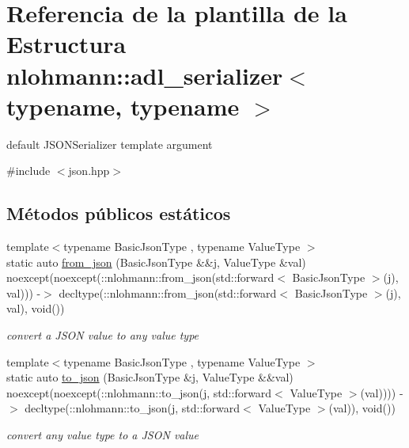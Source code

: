 \hypertarget{structnlohmann_1_1adl__serializer}{}\section{Referencia de la plantilla de la Estructura nlohmann\+:\+:adl\+\_\+serializer$<$ typename, typename $>$}
\label{structnlohmann_1_1adl__serializer}


default J\+S\+O\+N\+Serializer template argument  




{\ttfamily \#include $<$json.\+hpp$>$}

\subsection*{Métodos públicos estáticos}
\begin{DoxyCompactItemize}
\item 
{\footnotesize template$<$typename Basic\+Json\+Type , typename Value\+Type $>$ }\\static auto \mbox{\hyperlink{structnlohmann_1_1adl__serializer_a2c544585b8b1828a0f1eecd831d0496e}{from\+\_\+json}} (Basic\+Json\+Type \&\&j, Value\+Type \&val) noexcept(noexcept(\+::nlohmann\+::from\+\_\+json(std\+::forward$<$ Basic\+Json\+Type $>$(j), val))) -\/$>$ decltype(\+::nlohmann\+::from\+\_\+json(std\+::forward$<$ Basic\+Json\+Type $>$(j), val), void())
\begin{DoxyCompactList}\small\item\em convert a J\+S\+ON value to any value type \end{DoxyCompactList}\item 
{\footnotesize template$<$typename Basic\+Json\+Type , typename Value\+Type $>$ }\\static auto \mbox{\hyperlink{structnlohmann_1_1adl__serializer_a01b867bd5dce5249d4f7433b8f27def6}{to\+\_\+json}} (Basic\+Json\+Type \&j, Value\+Type \&\&val) noexcept(noexcept(\+::nlohmann\+::to\+\_\+json(j, std\+::forward$<$ Value\+Type $>$(val)))) -\/$>$ decltype(\+::nlohmann\+::to\+\_\+json(j, std\+::forward$<$ Value\+Type $>$(val)), void())
\begin{DoxyCompactList}\small\item\em convert any value type to a J\+S\+ON value \end{DoxyCompactList}\end{DoxyCompactItemize}


